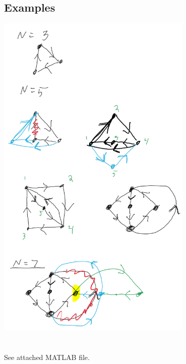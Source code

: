 \documentclass[]{article}
\numberwithin{equation}{section}
\begin{document}
\subsection*{Examples}
\includegraphics[width=0.7\textwidth]{figs/pblm3_examples.png}



















\newpage
\section{}

See attached MATLAB file.

\section{}
\end{document}
